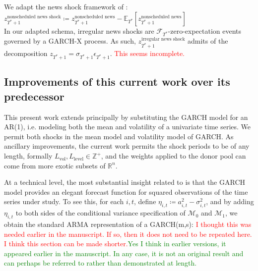 \documentclass[11pt]{article}
\def\mc#1{\mathcal{#1}} %
\def\E{\mathbb{E}} %
\def\mc#1{\mathcal{#1}}
\theoremstyle{definition}
\begin{document}

We adapt the news shock framework of \citet{kilian2017structural}: \\

$z_{T^{*}+1}^{\text{nonscheduled news shock}} \coloneqq z_{T^{*}+1}^{\text{nonscheduled news}} - \E_{T^{*}}[z_{T^{*}+1}^{\text{nonscheduled news}}]$ \\

In our adapted schema, irregular news shocks are $\mathcal{F}_{T^{*}}$-zero-expectation events governed by a GARCH-X process.  As such, $z_{T^{*}+1}^{\text{irregular news shock}}$ admits of the decomposition $z_{T^{*}+1} = \sigma_{T^{*}+1}\epsilon_{T^{*}+1}$. \textcolor{red}{This seems incomplete.}

\subsection{Improvements of this current work over its predecessor}

This present work extends \citet{lin2021minimizing} principally by substituting the GARCH model for an AR(1), i.e. modeling both the mean and volatility of a univariate time series.  We permit both shocks in the mean model and volatility model of GARCH.  As ancillary improvements, the current work permits the shock periods to be of any length, formally $L_{\text{vol}}, L_{\text{level}} \in \mathbb{Z}^{+}$, and the weights applied to the donor pool can come from more exotic subsets of $\mathbb{R}^{n}$.  

At a technical level, the most substantial insight related to \citet{lin2021minimizing} is that the GARCH model provides an elegant forecast function for squared observations of the time series under study. To see this, for each $i,t$, define $\eta_{i,t} \coloneqq a^{2}_{i,t} - \sigma^{2}_{i,t}$, and by adding $\eta_{i,t}$ to both sides of the conditional variance specification of $\mc{M}_{0}$ and $\mc{M}_{1}$, we obtain the standard ARMA representation of a GARCH(m,s): \textcolor{red}{I thought this was needed earlier in the manuscript. If so, then it does not need to be repeated here. I think this section can be made shorter.}\textcolor{green}{Yes I think in earlier versions, it appeared earlier in the manuscript.  In any case, it is not an original result and can perhaps be referred to rather than demonstrated at length.}
\end{document}
